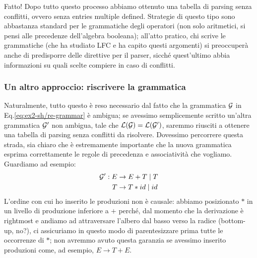 \documentclass[class=book, crop=false, oneside, 12pt]{standalone}
\begin{document}
Fatto! Dopo tutto questo processo abbiamo ottenuto una tabella di parsing senza conflitti, ovvero senza entries multiple defined. Strategie di questo tipo sono abbastanza standard per le grammatiche degli operatori (non solo aritmetici, si pensi alle precedenze dell'algebra booleana); all'atto pratico, chi scrive le grammatiche (che ha studiato LFC e ha capito questi argomenti) si preoccuperà anche di predisporre delle direttive per il parser, sicché quest'ultimo abbia informazioni su quali scelte compiere in caso di conflitti.

\subsubsection{Un altro approccio: riscrivere la grammatica}
Naturalmente, tutto questo è reso necessario dal fatto che la grammatica \(\mathcal{G}\) in Eq.\ref{eq:ex2-sh/re-grammar} è ambigua; se avessimo semplicemente scritto un'altra grammatica \(\mathcal{G}'\) non ambigua, tale che \(\mathcal{L}(\mathcal{G}) = \mathcal{L}(\mathcal{G}')\), saremmo riusciti a ottenere una tabella di parsing senza conflitti da risolvere. Dovessimo percorrere questa strada, sia chiaro che è estremamente importante che la nuova grammatica esprima correttamente le regole di precedenza e associatività che vogliamo. Guardiamo ad esempio:
\begin{align}
    \label{eq:ex2-sh/re-grammar_v2}
    \mathcal{G}': E &\to E + T \mid T \\
    T &\to T * id \mid id \notag
\end{align}
L'ordine con cui ho inserito le produzioni non è causale: abbiamo posizionato \(*\) in un livello di produzione inferiore a \(+\) perché, dal momento che la derivazione è rightmost e andiamo ad attraversare l'albero dal basso verso la radice (bottom-up, no?), ci assicuriamo in questo modo di parentesizzare prima tutte le occorrenze di \(\ast\); non avremmo avuto questa garanzia se avessimo inserito produzioni come, ad esempio, \(E \to T + E\). 
\end{document}
